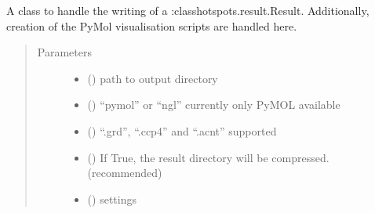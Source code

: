 \documentclass[letterpaper,10pt,english]{sphinxmanual}
\begin{document}
\begin{fulllineitems}
\label{\detokenize{hs_io_api:hotspots.hs_io.HotspotWriter}}
A class to handle the writing of a :class\textasciigrave{}hotspots.result.Result\textasciigrave{}. Additionally, creation of the
PyMol visualisation scripts are handled here.
\begin{quote}\begin{description}
\item[{Parameters}] \leavevmode\begin{itemize}
\item {} 
 () \textendash{} path to output directory

\item {} 
 () \textendash{} “pymol” or “ngl” currently only PyMOL available

\item {} 
 () \textendash{} “.grd”, “.ccp4” and “.acnt” supported

\item {} 
 () \textendash{} If True, the result directory will be compressed. (recommended)

\item {} 
 ({\hyperref[\detokenize{hs_io_api:hotspots.hs_io.HotspotWriter.Settings}]{}}) \textendash{} settings

\end{itemize}

\end{description}\end{quote}


\end{fulllineitems}
\end{document}
